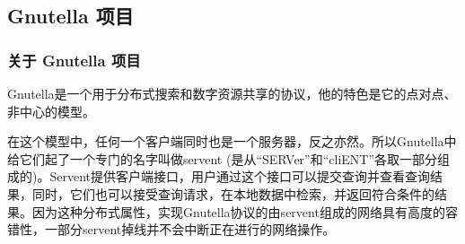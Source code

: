 \documentclass{ctexart}
\begin{document}
\subsection{Gnutella 项目}
\subsubsection{关于 Gnutella 项目}
Gnutella是一个用于分布式搜索和数字资源共享的协议，他的特色是它的点对点、非中心的模型。

在这个模型中，任何一个客户端同时也是一个服务器，反之亦然。所以Gnutella中给它们起了一个专门的名字叫做servent (是从“SERVer”和“cliENT”各取一部分组成的)。Servent提供客户端接口，用户通过这个接口可以提交查询并查看查询结果，同时，它们也可以接受查询请求，在本地数据中检索，并返回符合条件的结果。因为这种分布式属性，实现Gnutella协议的由servent组成的网络具有高度的容错性，一部分servent掉线并不会中断正在进行的网络操作。
\end{document}
